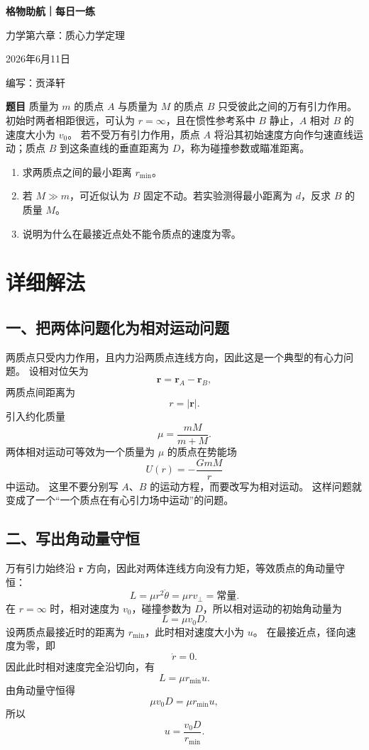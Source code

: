 \documentclass[11pt,a4paper]{ctexart}
\begin{document}
\begin{center}
  {\Large\bfseries\color{mainblue} 格物助航｜每日一练}\par
  \vspace{0.25em}
  {\large 力学第六章：质心力学定理}\par
  \vspace{0.35em}
  {\small 2026年6月11日}\par
  \vspace{0.35em}
  {\small 编写：贡泽轩}
\end{center}

\vspace{-0.3em}

\begin{problemBox}
\noindent\textbf{题目}\quad
质量为 $m$ 的质点 $A$ 与质量为 $M$ 的质点 $B$ 只受彼此之间的万有引力作用。
初始时两者相距很远，可认为 $r=\infty$，且在惯性参考系中 $B$ 静止，$A$ 相对 $B$ 的速度大小为 $v_0$。
若不受万有引力作用，质点 $A$ 将沿其初始速度方向作匀速直线运动；质点 $B$ 到这条直线的垂直距离为 $D$，称为碰撞参数或瞄准距离。
\begin{enumerate}
    \item 求两质点之间的最小距离 $r_{\min}$。
    \item 若 $M\gg m$，可近似认为 $B$ 固定不动。若实验测得最小距离为 $d$，反求 $B$ 的质量 $M$。
    \item 说明为什么在最接近点处不能令质点的速度为零。
\end{enumerate}
\end{problemBox}


\section*{详细解法}

\subsection*{一、把两体问题化为相对运动问题}
两质点只受内力作用，且内力沿两质点连线方向，因此这是一个典型的有心力问题。
设相对位矢为
\[
\bm r=\bm r_A-\bm r_B,
\]
两质点间距离为
\[
r=|\bm r|.
\]
引入约化质量
\[
\mu=\frac{mM}{m+M}.
\]
两体相对运动可等效为一个质量为 $\mu$ 的质点在势能场
\[
U(r)=-\frac{GmM}{r}
\]
中运动。
这里不要分别写 $A$、$B$ 的运动方程，而要改写为相对运动。
这样问题就变成了一个“一个质点在有心引力场中运动”的问题。

\subsection*{二、写出角动量守恒}
万有引力始终沿 $\bm r$ 方向，因此对两体连线方向没有力矩，等效质点的角动量守恒：
\[
L=\mu r^2\dot{\theta}=\mu r v_\perp=\text{常量}.
\]
在 $r=\infty$ 时，相对速度为 $v_0$，碰撞参数为 $D$，所以相对运动的初始角动量为
\[
L=\mu v_0D.
\]
设两质点最接近时的距离为 $r_{\min}$，此时相对速度大小为 $u$。
在最接近点，径向速度为零，即
\[
\dot r=0.
\]
因此此时相对速度完全沿切向，有
\[
L=\mu r_{\min}u.
\]
由角动量守恒得
\[
\mu v_0D=\mu r_{\min}u,
\]
所以
\[
u=\frac{v_0D}{r_{\min}}.
\]
\end{document}
